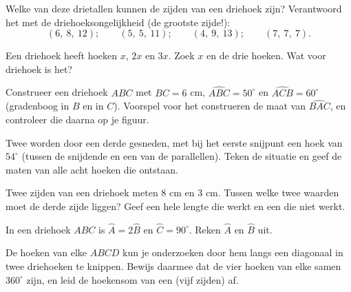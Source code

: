 \begin{exercise}[$\star$]\label{exo:g7:triangles:5}
Welke van deze drietallen kunnen de zijden van een driehoek zijn? Verantwoord het
met de driehoeksongelijkheid (de grootste zijde!):
\[
(6,\ 8,\ 12); \qquad
(5,\ 5,\ 11); \qquad
(4,\ 9,\ 13); \qquad
(7,\ 7,\ 7).
\]
\end{exercise}

\begin{exercise}[$\star$]\label{exo:g7:triangles:6}
Een driehoek heeft hoeken $x$, $2x$ en $3x$. Zoek $x$ en de drie hoeken. Wat voor
driehoek is het?
\end{exercise}

\begin{exercise}[$\star$]\label{exo:g7:triangles:7}
Construeer een driehoek $ABC$ met $BC = 6$ cm, $\widehat{ABC} = 50^\circ$ en
$\widehat{ACB} = 60^\circ$ (gradenboog in $B$ en in $C$). Voorspel voor het
construeren de maat van $\widehat{BAC}$, en controleer die daarna op je figuur.
\end{exercise}

\begin{exercise}[$\star\star$]\label{exo:g7:triangles:8}
Twee  worden door een derde  gesneden, met bij het eerste
snijpunt een hoek van $54^\circ$ (tussen de snijdende  en een van de
parallellen). Teken de situatie en geef de maten van alle acht hoeken die ontstaan.
\end{exercise}

\begin{exercise}[$\star\star$]\label{exo:g7:triangles:9}
Twee zijden van een driehoek meten $8$ cm en $3$ cm. Tussen welke twee waarden moet
de derde zijde liggen? Geef een hele lengte die werkt en een die niet werkt.
\end{exercise}

\begin{exercise}[$\star\star$]\label{exo:g7:triangles:10}
In een driehoek $ABC$ is $\widehat A = 2\widehat B$ en $\widehat C = 90^\circ$.
Reken $\widehat A$ en $\widehat B$ uit.
\end{exercise}

\begin{exercise}[$\star\star\star$]\label{exo:g7:triangles:11}
De hoeken van elke  $ABCD$ kun je onderzoeken door hem langs een diagonaal
in twee driehoeken te knippen. Bewijs daarmee dat de vier hoeken van elke 
samen $360^\circ$ zijn, en leid de hoekensom van een  (vijf zijden) af.
\end{exercise}

